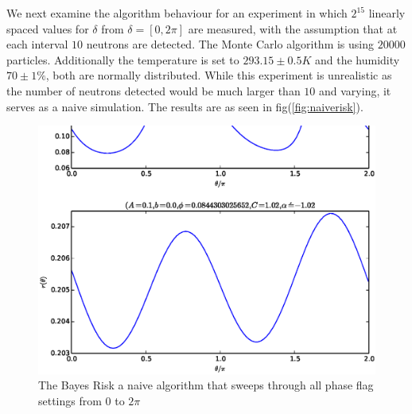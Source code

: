 We next examine the algorithm behaviour for an experiment in which $2^15$ linearly spaced values for $\delta$ from $\delta=[0,2\pi]$ are measured, with the assumption that at each interval $10$ neutrons are detected. The Monte Carlo algorithm is using $20000$ particles. Additionally the temperature is set to $293.15\pm0.5K$ and the humidity $70\pm1\%$, both are normally distributed. While this experiment is unrealistic as the number of neutrons detected would be much larger than $10$ and varying, it serves as a naive simulation. The results are as seen in fig(\ref{fig:naiverisk}). 
\begin{figure}[ht!]
\centering
\includegraphics[scale=0.5]{Figures/risks1.eps}
\caption{The Bayes Risk a naive algorithm that sweeps through all phase flag settings from $0$ to $2\pi$}
\label{fig:naiverisks}
\end{figure}


